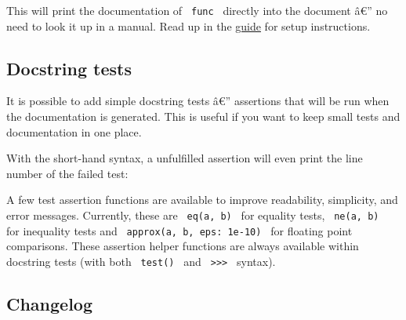 This will print the documentation of \texttt{\ func\ } directly into the
document â€'' no need to look it up in a manual. Read up in the
\href{https://github.com/Mc-Zen/tidy/releases/download/v0.3.0/tidy-guide.pdf}{guide}
for setup instructions.

\subsection{Docstring tests}\label{docstring-tests}

It is possible to add simple docstring tests â€'' assertions that will
be run when the documentation is generated. This is useful if you want
to keep small tests and documentation in one place.

\begin{Shaded}
\begin{Highlighting}[]
\NormalTok{/// )}
\end{Highlighting}
\end{Shaded}

With the short-hand syntax, a unfulfilled assertion will even print the
line number of the failed test:

\begin{Shaded}
\begin{Highlighting}[]
\end{Highlighting}
\end{Shaded}

A few test assertion functions are available to improve readability,
simplicity, and error messages. Currently, these are
\texttt{\ eq(a,\ b)\ } for equality tests, \texttt{\ ne(a,\ b)\ } for
inequality tests and \texttt{\ approx(a,\ b,\ eps:\ 1e-10)\ } for
floating point comparisons. These assertion helper functions are always
available within docstring tests (with both \texttt{\ test()\ } and
\texttt{\ \textgreater{}\textgreater{}\textgreater{}\ } syntax).

\subsection{Changelog}\label{changelog}

